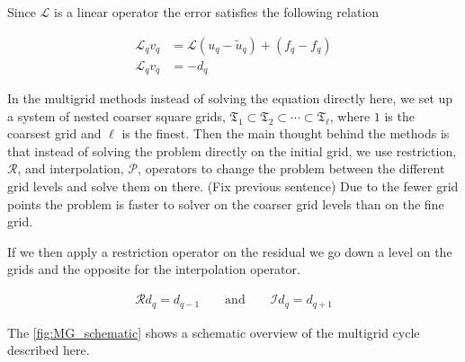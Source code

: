 	Since \(\mathcal{L}\) is a linear operator the error satisfies the following relation

	\begin{align}
		\mathcal{L}_q v_q &= \mathcal{L}(u_q - \tilde{u}_q)  + (f_q- f_q)
		\\
		\mathcal{L}_q v_q &= - d_q \label{eq:diff_MG}
	\end{align}

	In the multigrid methods instead of solving the equation directly here, we set
	up a system of nested coarser square grids,
	\(\mathfrak{T}_1 \subset \mathfrak{T}_2 \subset \cdots \subset \mathfrak{T}_\ell\),
	where \(1\) is the coarsest grid and \(\ell\) is the finest. Then the main thought
	behind the methods is that instead of solving the problem directly on the initial
	grid, we use restriction, \( \mathcal{R} \), and interpolation, \( \mathcal{P} \),
	operators to change the problem between the different grid levels and solve them
	on there. (Fix previous sentence) Due to the fewer grid points the problem is
	faster to solver on the coarser grid levels than on the fine grid.

	If we then apply a restriction operator on the residual we go down a level on
	the grids and the opposite for the interpolation operator.

	\begin{align}
		\mathcal{R} d_q = d_{q-1} \qquad \text{and} \qquad \mathcal{I} d_q = d_{q + 1}
	\end{align}

    

    The \cref{fig:MG_schematic} shows a schematic overview of the multigrid cycle described here.



